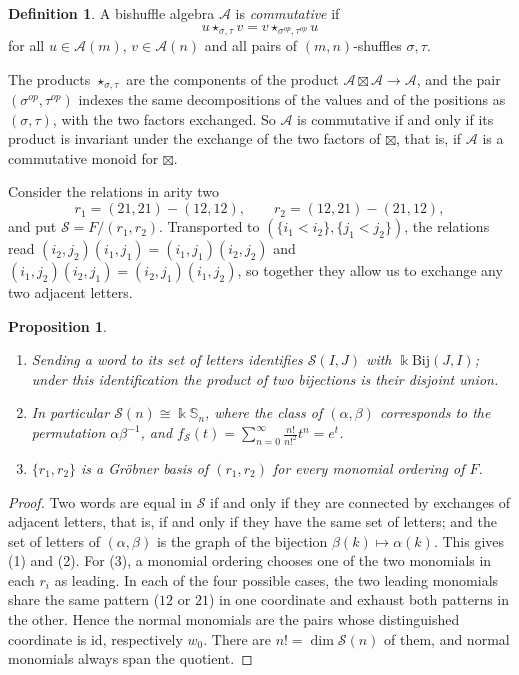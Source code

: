 \documentclass[11pt]{amsart}
\newtheorem{proposition}[theorem]{Proposition}
\theoremstyle{definition}
\newtheorem{definition}[theorem]{Definition}
\theoremstyle{remark}
\newcommand{\bS}{\mathbb{S}}
\newcommand{\kk}{\Bbbk}
\newcommand{\cA}{\mathscr{A}}
\newcommand{\cS}{\mathscr{S}}
\newcommand{\Bij}{\mathrm{Bij}}
\newcommand{\id}{\mathrm{id}}
\begin{document}
\begin{definition}\label{def:commutative}
A bishuffle algebra $\cA$ is \emph{commutative} if
\[
u\star_{\sigma,\tau}v=v\star_{\sigma^{op},\tau^{op}}u
\]
for all $u\in\cA(m)$, $v\in\cA(n)$ and all pairs of $(m,n)$-shuffles $\sigma,\tau$.
\end{definition}

The products $\star_{\sigma,\tau}$ are the components of the product $\cA\boxtimes\cA\to\cA$, and the pair $(\sigma^{op},\tau^{op})$ indexes the same decompositions of the values and of the positions as $(\sigma,\tau)$, with the two factors exchanged. So $\cA$ is commutative if and only if its product is invariant under the exchange of the two factors of $\boxtimes$, that is, if $\cA$ is a commutative monoid for $\boxtimes$.

Consider the relations in arity two
\[
r_1=(21,21)-(12,12),\qquad r_2=(12,21)-(21,12),
\]
and put $\cS=F/(r_1,r_2)$. Transported to $(\{i_1<i_2\},\{j_1<j_2\})$, the relations read $(i_2,j_2)(i_1,j_1)=(i_1,j_1)(i_2,j_2)$ and $(i_1,j_2)(i_2,j_1)=(i_2,j_1)(i_1,j_2)$, so together they allow us to exchange any two adjacent letters.

\begin{proposition}\label{prop:S}
\begin{enumerate}
\item Sending a word to its set of letters identifies $\cS(I,J)$ with $\kk\Bij(J,I)$; under this identification the product of two bijections is their disjoint union.
\item In particular $\cS(n)\cong\kk\bS_n$, where the class of $(\alpha,\beta)$ corresponds to the permutation $\alpha\beta^{-1}$, and $f_\cS(t)=\sum_{n=0}^{\infty} \frac{n!}{n!^2}t^n= e^t$.
\item $\{r_1,r_2\}$ is a Gr\"obner basis of $(r_1,r_2)$ for every monomial ordering of $F$.
\end{enumerate}
\end{proposition}

\begin{proof}
Two words are equal in $\cS$ if and only if they are connected by exchanges of adjacent letters, that is, if and only if they have the same set of letters; and the set of letters of $(\alpha,\beta)$ is the graph of the bijection $\beta(k)\mapsto\alpha(k)$. This gives (1) and (2). For (3), a monomial ordering chooses one of the two monomials in each $r_i$ as leading. In each of the four possible cases, the two leading monomials share the same pattern ($12$ or $21$) in one coordinate and exhaust both patterns in the other. Hence the normal monomials are the pairs whose distinguished coordinate is $\id$, respectively $w_0$. There are $n!=\dim\cS(n)$ of them, and normal monomials always span the quotient.
\end{proof}
\end{document}
